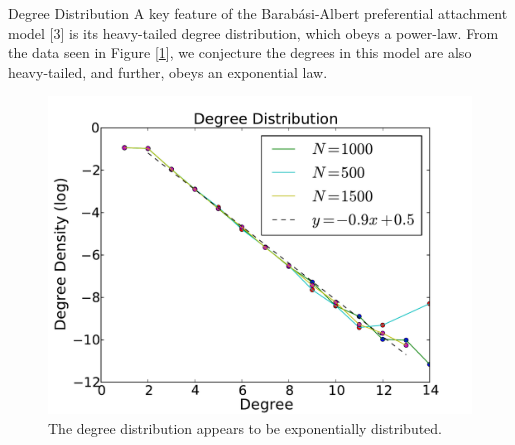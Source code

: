 \documentclass[final]{beamer}
\newlength{\onecolwid}
\begin{document}
\begin{frame}[t]
\begin{columns}[t]
\begin{column}{\onecolwid}
\begin{block}{Degree Distribution}
A key feature of the Barab\'{a}si-Albert preferential attachment model [3] is its heavy-tailed degree distribution, which obeys a power-law.  From the data seen in Figure [\ref{DD}], we conjecture the degrees in this model are also heavy-tailed, and further, obeys an exponential law.
\begin{figure}
\includegraphics[width=0.65\linewidth]{DDPEAK.pdf}
\caption{The degree distribution appears to be exponentially distributed. }
\label{DD}
\end{figure}
\end{block}


\end{column}
\end{columns}
\end{frame}
\end{document}
